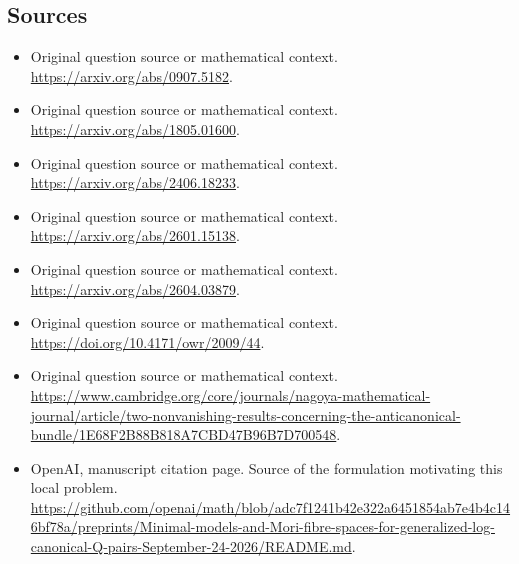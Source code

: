 \documentclass[11pt]{article}
\begin{document}
\subsection{Sources}
\begin{itemize}
\item[S1] Original question source or mathematical context.
\url{https://arxiv.org/abs/0907.5182}.
\item[S2] Original question source or mathematical context.
\url{https://arxiv.org/abs/1805.01600}.
\item[S3] Original question source or mathematical context.
\url{https://arxiv.org/abs/2406.18233}.
\item[S4] Original question source or mathematical context.
\url{https://arxiv.org/abs/2601.15138}.
\item[S5] Original question source or mathematical context.
\url{https://arxiv.org/abs/2604.03879}.
\item[S6] Original question source or mathematical context.
\url{https://doi.org/10.4171/owr/2009/44}.
\item[S7] Original question source or mathematical context.
\url{https://www.cambridge.org/core/journals/nagoya-mathematical-journal/article/two-nonvanishing-results-concerning-the-anticanonical-bundle/1E68F2B88B818A7CBD47B96B7D700548}.
\item[S8] OpenAI, manuscript citation page. Source of the formulation motivating this local problem.
\url{https://github.com/openai/math/blob/adc7f1241b42e322a6451854ab7e4b4c146bf78a/preprints/Minimal-models-and-Mori-fibre-spaces-for-generalized-log-canonical-Q-pairs-September-24-2026/README.md}.
\end{itemize}
\end{document}
